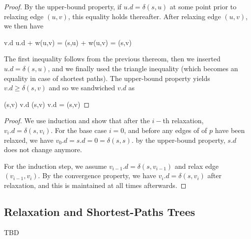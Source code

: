 
\begin{proof}
  By the upper-bound property, if $u.d = \delta(s,u)$ at some point prior to relaxing edge $(u,v)$, this equality holds thereafter. After relaxing edge $(u,v)$, we then have

  \bee
  v.d \leq u.d + w(u,v) = \delta(s,u) + w(u,v) = \delta(s,v)
  \eee

  The first inequality follows from the previous thereom, then we inserted $u.d = \delta(s,u)$, and we finally used the triangle inequality (which becomes an equality in case of shortest paths). The upper-bound property yields $v.d \geq \delta(s,v)$ and so we sandwiched $v.d$ as

  \bee
  \delta(s,v) \leq v.d \leq \delta(s,v) \rightarrow v.d = \delta(s,v)
  \eee
\end{proof}


\begin{proof}
  We use induction and show that after the $i-$th relaxation, $v_i.d = \delta(s, v_i)$. For the base case $i=0$, and before any edges of of $p$ have been relaxed, we have $v_0.d=s.d=0=\delta(s,s)$. by the upper-bound property, $s.d$ does not change anymore.

  For the induction step, we assume $v_{i-1}.d=\delta(s,v_{i-1})$ and relax edge $(v_{i-1},v_i)$. By the convergence property, we have $v_i.d=\delta(s,v_i)$ after relaxation, and this is maintained at all times afterwards.
\end{proof}


\subsection{Relaxation and Shortest-Paths Trees}

TBD




